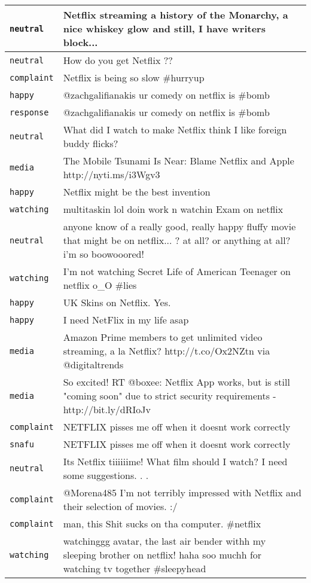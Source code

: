 \begin{center}
\begin{longtable}{|l|p{120mm}|}
      \tabularnewline\hline
         \texttt{neutral} & Netflix streaming a history of the Monarchy, a nice whiskey glow and still, I have writers block...
      \tabularnewline\hline
         \texttt{neutral} & How do you get Netflix ??
      \tabularnewline\hline
         \texttt{complaint} & Netflix is being so slow \#hurryup
      \tabularnewline\hline
         \texttt{happy} & @zachgalifianakis ur comedy on netflix is \#bomb
      \tabularnewline\hline
         \texttt{response} & @zachgalifianakis ur comedy on netflix is \#bomb
      \tabularnewline\hline
         \texttt{neutral} & What did I watch to make Netflix think I like foreign buddy flicks?
      \tabularnewline\hline
         \texttt{media} & The Mobile Tsunami Is Near: Blame Netflix and Apple http://nyti.ms/i3Wgv3
      \tabularnewline\hline
         \texttt{happy} & Netflix might be the best invention
      \tabularnewline\hline
         \texttt{watching} & multitaskin lol doin work n watchin Exam on netflix
      \tabularnewline\hline
         \texttt{neutral} & anyone know of a really good, really happy fluffy movie that might be on netflix... ? at all? or anything at all? i'm so boowooored!
      \tabularnewline\hline
         \texttt{watching} & I'm not watching Secret Life of American Teenager on netflix o\_O \#lies
      \tabularnewline\hline
         \texttt{happy} & UK Skins on Netflix. Yes.
      \tabularnewline\hline
         \texttt{happy} & I need NetFlix in my life asap
      \tabularnewline\hline
         \texttt{media} & Amazon Prime members to get unlimited video streaming, a la Netflix? http://t.co/Ox2NZtn via @digitaltrends
      \tabularnewline\hline
         \texttt{media} & So excited! RT @boxee: Netflix App works, but is still "coming soon" due to strict security requirements - http://bit.ly/dRIoJv
      \tabularnewline\hline
         \texttt{complaint} & NETFLIX pisses me off when it doesnt work correctly
      \tabularnewline\hline
         \texttt{snafu} & NETFLIX pisses me off when it doesnt work correctly
      \tabularnewline\hline
         \texttt{neutral} & Its Netflix tiiiiiime! What film should I watch? I need some suggestions. . .
      \tabularnewline\hline
         \texttt{complaint} & @Morena485 I'm not terribly impressed with Netflix and their selection of movies. :/
      \tabularnewline\hline
         \texttt{complaint} & man, this Shit sucks on tha computer. \#netflix
      \tabularnewline\hline
         \texttt{watching} & watchinggg avatar, the last air bender withh my sleeping brother on netflix! haha soo muchh for watching tv together \#sleepyhead

\end{longtable}
\end{center}

